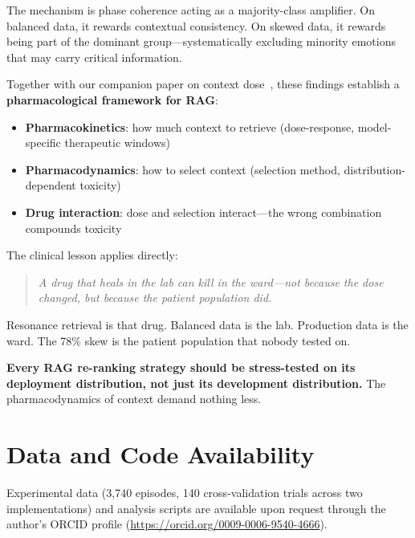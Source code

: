 \documentclass[11pt,a4paper]{article}
\begin{document}
The mechanism is phase coherence acting as a majority-class amplifier. On balanced data, it rewards contextual consistency. On skewed data, it rewards being part of the dominant group---systematically excluding minority emotions that may carry critical information.

Together with our companion paper on context dose~\citep{jo2026pharmacokinetics}, these findings establish a \textbf{pharmacological framework for RAG}:

\begin{itemize}[itemsep=2pt]
  \item \textbf{Pharmacokinetics}: how much context to retrieve (dose-response, model-specific therapeutic windows)
  \item \textbf{Pharmacodynamics}: how to select context (selection method, distribution-dependent toxicity)
  \item \textbf{Drug interaction}: dose and selection interact---the wrong combination compounds toxicity
\end{itemize}

The clinical lesson applies directly:

\begin{quote}
\textit{A drug that heals in the lab can kill in the ward---not because the dose changed, but because the patient population did.}
\end{quote}

Resonance retrieval is that drug. Balanced data is the lab. Production data is the ward. The 78\% skew is the patient population that nobody tested on.

\textbf{Every RAG re-ranking strategy should be stress-tested on its deployment distribution, not just its development distribution.} The pharmacodynamics of context demand nothing less.

\section*{Data and Code Availability}

Experimental data (3,740 episodes, 140 cross-validation trials across two implementations) and analysis scripts are available upon request through the author's ORCID profile (\url{https://orcid.org/0009-0006-9540-4666}).
\end{document}
